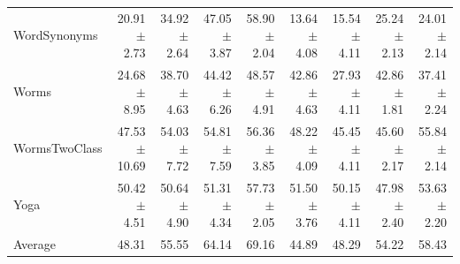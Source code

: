 \begin{landscape}
\begin{longtable}{lrrrrrrrr}
WordSynonyms & 20.91 $\pm$ 2.73 & 34.92 $\pm$ 2.64 & 47.05 $\pm$ 3.87 & 58.90 $\pm$ 2.04 & 13.64 $\pm$ 4.08 & 15.54 $\pm$ 4.11 & 25.24 $\pm$ 2.13 & 24.01 $\pm$ 2.14 \\
Worms & 24.68 $\pm$ 8.95 & 38.70 $\pm$ 4.63 & 44.42 $\pm$ 6.26 & 48.57 $\pm$ 4.91 & 42.86 $\pm$ 4.63 & 27.93 $\pm$ 4.11 & 42.86 $\pm$ 1.81 & 37.41 $\pm$ 2.24 \\
WormsTwoClass & 47.53 $\pm$ 10.69 & 54.03 $\pm$ 7.72 & 54.81 $\pm$ 7.59 & 56.36 $\pm$ 3.85 & 48.22 $\pm$ 4.09 & 45.45 $\pm$ 4.11 & 45.60 $\pm$ 2.17 & 55.84 $\pm$ 2.14 \\
Yoga & 50.42 $\pm$ 4.51 & 50.64 $\pm$ 4.90 & 51.31 $\pm$ 4.34 & 57.73 $\pm$ 2.05 & 51.50 $\pm$ 3.76 & 50.15 $\pm$ 4.11 & 47.98 $\pm$ 2.40 & 53.63 $\pm$ 2.20 \\
\midrule
Average & 48.31 & 55.55 & 64.14 & 69.16 & 44.89 & 48.29 & 54.22 & 58.43 \\
\bottomrule
\end{longtable}
\end{landscape}
